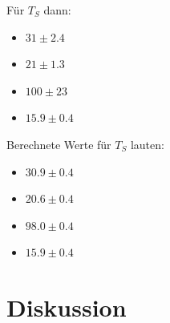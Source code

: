 \documentclass[11pt,a4paper]{article}
\begin{document}
F\"ur $T_S$ dann:
\begin{itemize}
	\item $31\pm2.4$
	\item $21\pm1.3$
	\item $100\pm23$
	\item $15.9\pm0.4$
\end{itemize}

Berechnete Werte f\"ur $T_S$ lauten:
\begin{itemize}
	\item $30.9\pm0.4$
	\item $20.6\pm0.4$
	\item $98.0\pm0.4$
	\item $15.9\pm0.4$
\end{itemize}


\section{Diskussion}
\end{document}
